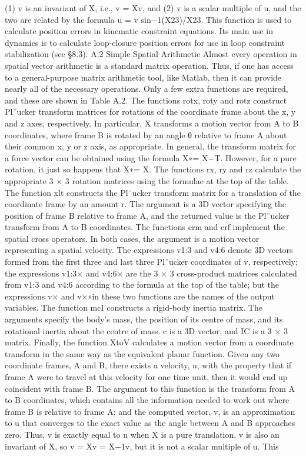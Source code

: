(1) v is an invariant of X, i.e., v = Xv, and (2) v is a scalar multiple of u, and the two are related by the formula u = v sin−1(X23)/X23. This function is used to calculate position errors in kinematic constraint equations. Its main use in dynamics is to calculate loop-closure position errors for use in loop constraint stabilization (see §8.3). A.2 Simple Spatial Arithmetic Almost every operation in spatial vector arithmetic is a standard matrix operation. Thus, if one has access to a general-purpose matrix arithmetic tool, like Matlab, then it can provide nearly all of the necessary operations. Only a few extra functions are required, and these are shown in Table A.2. The functions rotx, roty and rotz construct Pl¨ucker transform matrices for rotations of the coordinate frame about the x, y and z axes, respectively. In particular, X transforms a motion vector from A to B coordinates, where frame B is rotated by an angle θ relative to frame A about their common x, y or z axis, as appropriate. In general, the transform matrix for a force vector can be obtained using the formula X∗= X−T. However, for a pure rotation, it just so happens that X∗= X. The functions rx, ry and rz calculate the appropriate 3 × 3 rotation matrices using the formulae at the top of the table. The function xlt constructs the Pl¨ucker transform matrix for a translation of the coordinate frame by an amount r. The argument is a 3D vector specifying the position of frame B relative to frame A, and the returned value is the Pl¨ucker transform from A to B coordinates. The functions crm and crf implement the spatial cross operators. In both cases, the argument is a motion vector representing a spatial velocity. The expressions v1:3 and v4:6 denote 3D vectors formed from the first three and last three Pl¨ucker coordinates of v, respectively; the expressions v1:3× and v4:6× are the 3 × 3 cross-product matrices calculated from v1:3 and v4:6 according to the formula at the top of the table; but the expressions v× and v×∗in these two functions are the names of the output variables. The function mcI constructs a rigid-body inertia matrix. The arguments specify the body’s mass, the position of its centre of mass, and its rotational inertia about the centre of mass. c is a 3D vector, and IC is a 3 × 3 matrix. Finally, the function XtoV calculates a motion vector from a coordinate transform in the same way as the equivalent planar function. Given any two coordinate frames, A and B, there exists a velocity, u, with the property that if frame A were to travel at this velocity for one time unit, then it would end up coincident with frame B. The argument to this function is the transform from A to B coordinates, which contains all the information needed to work out where frame B is relative to frame A; and the computed vector, v, is an approximation to u that converges to the exact value as the angle between A and B approaches zero. Thus, v is exactly equal to u when X is a pure translation. v is also an invariant of X, so v = Xv = X−1v, but it is not a scalar multiple of u. This

